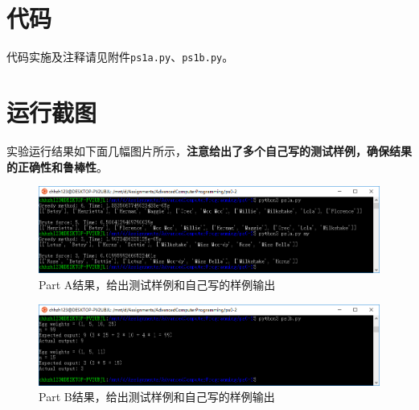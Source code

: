 \documentclass[logo,reportComp]{thesis}
\begin{document}
\section{代码}
代码实施及注释请见附件\verb'ps1a.py'、\verb'ps1b.py'。

\section{运行截图}
实验运行结果如下面几幅图片所示，\textbf{注意给出了多个自己写的测试样例，确保结果的正确性和鲁棒性}。
\begin{figure}[H]
\centering
\includegraphics[width=\linewidth]{fig/a.PNG}
\caption{Part A结果，给出测试样例和自己写的样例输出}
\label{fig:a}
\end{figure}

\begin{figure}[H]
\centering
\includegraphics[width=\linewidth]{fig/b.PNG}
\caption{Part B结果，给出测试样例和自己写的样例输出}
\label{fig:b}
\end{figure}
\end{document}
